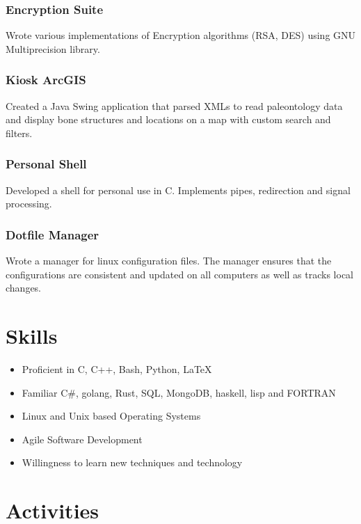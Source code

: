 \documentclass[11pt]{article}
\begin{document}
\subsubsection{Encryption Suite}
Wrote various implementations of Encryption algorithms (RSA, DES) using GNU Multiprecision library.

\subsubsection{Kiosk ArcGIS}
 Created a Java Swing application that parsed XMLs to read paleontology data and display bone structures and 
 locations on a map with custom search and filters.

\subsubsection{Personal Shell}
Developed a shell for personal use in C. Implements pipes, redirection and signal processing.

\subsubsection{Dotfile Manager}
Wrote a manager for linux configuration files.
The manager ensures that the configurations are consistent and updated on all computers as well as tracks local changes.

\section{S{\color{gray}kills}}

\begin{multicols}{2}
	\begin{itemize}
	\item Proficient in C, C++, Bash, Python, \LaTeX
	\item Familiar C\#, golang, Rust, SQL, MongoDB, haskell, lisp and FORTRAN
	\item Linux and Unix based Operating Systems
	\item Agile Software Development
	\item Willingness to learn new techniques and technology
\end{itemize}
\end{multicols}

\section{A{\color{gray}ctivities}}
\end{document}
